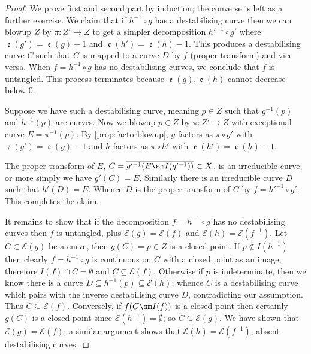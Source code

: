 \documentclass[11pt, final]{amsart}
\newcommand{\E}{\mathcal{E}}
\newcommand{\nin}{\notin}
\newcommand{\emp}{\emptyset}
\newcommand{\nice}{untangled}
\DeclareMathOperator{\comp}{\mathfrak e}
\begin{document}
\begin{proof}
We prove first and second part by induction; the converse is left as a further exercise. We claim that if $h^{-1} \circ g$ has a destabilising curve then we can blowup $Z$ by $\pi : Z' \to Z$ to get a simpler decomposition $h'^{-1} \circ g'$ where $\comp(g') = \comp(g) - 1$ and $\comp(h') = \comp(h) - 1$. This produces a destabilising curve $C$ such that $C$ is mapped to a curve $D$ by $f$ (proper transform) and vice versa. When $f = h^{-1} \circ g$ has no destabilising curves, we conclude that $f$ is \nice{}. This process terminates because $\comp(g), \comp(h)$ cannot decrease below $0$.

Suppose we have such a destabilising curve, meaning $p \in Z$ such that $g^{-1}(p)$ and $h^{-1}(p)$ are curves. Now we blowup $p \in Z$ by $\pi : Z' \to Z$ with exceptional curve $E = \pi^{-1}(p)$. By \autoref{prop:factorblowup}, $g$ factors as $\pi \circ g'$ with $\comp(g') = \comp(g) - 1$ and $h$ factors as $\pi \circ h'$ with $\comp(h') = \comp(h) - 1$.

    \begin{center}
  \end{center}
 
The proper transform of $E$, $C = \overline{g'^{-1}(E \sm I(g'^{-1}))} \subset X$, is an irreducible curve; or more simply we have $g'(C) = E$. Similarly there is an irreducible curve $D$ such that $h'(D) = E$. Whence $D$ is the proper transform of $C$ by $f = h'^{-1} \circ g'$. This completes the claim.
 
 It remains to show that if the decomposition $f = h^{-1} \circ g$ has no destabilising curves then $f$ is \nice{}, plus $\E(g) = \E(f)$ and $\E(h) = \E(f^{-1})$. Let $C \subset \E(g)$ be a curve, then $g(C) = p \in Z$ is a closed point. If $p \nin I(h^{-1})$ then clearly $f = h^{-1} \circ g$ is continuous on $C$ with a closed point as an image, therefore $I(f) \cap C = \emp$ and $C \subseteq \E(f)$. Otherwise if $p$ is indeterminate, then we know there is a curve $D \subseteq h^{-1}(p) \subseteq \E(h)$; whence $C$ is a destabilising curve which pairs with the inverse destabilising curve $D$, contradicting our assumption. Thus $C \subseteq \E(f)$. Conversely, if $f(C \sm I(f))$ is a closed point then certainly $g(C)$ is a closed point since $\E(h^{-1}) = \emp$; so $C \subseteq \E(g)$. We have shown that $\E(g) = \E(f)$; a similar argument shows that $\E(h) = \E(f^{-1})$, absent destabilising curves.
\end{proof}
\end{document}
